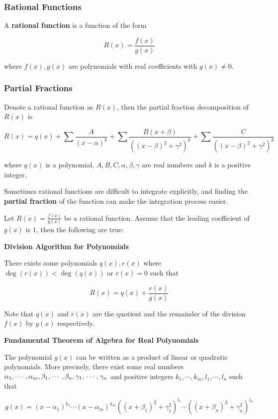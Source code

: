 \documentclass[a4paper,12pt]{article}
\begin{document}
\subsubsection{Rational Functions}
\begin{dft}
  A \textbf{rational function} is a function of the form

  $$R(x)=\frac{f(x)}{g(x)}$$

  where $f(x),g(x)$ are polynomials with real coefficients with $g(x)\neq 0$.
\end{dft}

\subsubsection{Partial Fractions}
\begin{dft}
  Denote a rational function as $R(x)$, then the partial fraction decomposition of $R(x)$ is

  $$R(x)=q(x)+\sum\frac{A}{(x-\alpha)^{k}}+\sum\frac{B(x+\beta)}{((x-\beta)^{2}+\gamma^{2})^{k}}+\sum\frac{C}{((x-\beta)^{2}+\gamma^{2})^{k}}$$\s

  where $q(x)$ is a polynomial, $A,B,C,\alpha,\beta,\gamma$ are real numbers and $k$ is a positive integer.
\end{dft}\n

Sometimes rational functions are difficult to integrate explicitly, and finding the \textbf{partial fraction} of the function can make the integration process easier.\n

\begin{thm}
  Let $R(x)=\frac{f(x)}{g(x)}$ be a rational function. Assume that the leading coefficient of $g(x)$ is $1$, then the following are true:

  \begin{alist}
    \item \textbf{Division Algorithm for Polynomials}\n

    There exists some polynomials $q(x),r(x)$ where $\deg(r(x))<\deg(q(x))$ or $r(x)=0$ such that

    $$R(x)=q(x)+\frac{r(x)}{g(x)}$$\s

    Note that $q(x)$ and $r(x)$ are the quotient and the remainder of the division $f(x)$ by $g(x)$ respectively.

    \item \textbf{Fundamental Theorem of Algebra for Real Polynomials}\n

    The polynomial $g(x)$ can be written as a product of linear or quadratic polynomials. More precisely, there exist some real numbers $\alpha_{1},\cdots,\alpha_{m},\beta_{1},\cdots,\beta_{n},\gamma_{1},\\\cdots,\gamma_{n}$ and positive integers $k_{1},\cdots,k_{m},l_{1},\cdots,l_{n}$ such that

    $$g(x)=(x-\alpha_{1})^{k_{1}}\cdots(x-\alpha_{m})^{k_{m}}((x+\beta_{1})^{2}+\gamma_{1}^{2})^{l_{1}}\cdots((x+\beta_{n})^{2}+\gamma_{n}^{2})^{l_{n}}$$
  \end{alist}
\end{thm}\n
\end{document}
